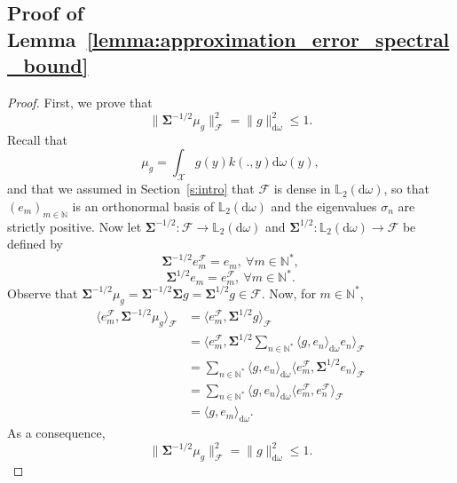 \documentclass[twoside,11pt]{book}
\numberwithin{theorem}{chapter}
\numberwithin{definition}{chapter}
\numberwithin{proposition}{chapter}
\numberwithin{corollary}{chapter}
\numberwithin{example}{chapter}
\numberwithin{lemma}{chapter}
\numberwithin{assumption}{chapter}
\newcommand{\ab}[1]{\textcolor{red}{#1}}
\begin{document}
\subsection{Proof of Lemma~\ref{lemma:approximation_error_spectral_bound}}
\label{s:proofOfSeparationLemma}
\begin{proof}
First, we prove that
\begin{equation}
  \|\bm{\Sigma}^{-1/2}\mu_{g}\|_{\mathcal{F}}^{2} = \|g\|_{\mathrm{d}\omega}^{2} \leq 1.
\end{equation} 
 Recall that
\begin{equation}
\mu_{g} = \int_{\mathcal{X}} g(y)k(.,y) \mathrm{d}\omega(y),
\end{equation}
and that we assumed in Section~\ref{s:intro} that $\mathcal{F}$ is dense in $\mathbb{L}_{2}(\mathrm{d}\omega)$, so that $(e_{m})_{m \in \mathbb{N}}$ is an orthonormal basis of $\mathbb{L}_{2}(\mathrm{d}\omega)$ and the eigenvalues $\sigma_{n}$ are strictly positive. Now let $\bm{\Sigma}^{-1/2} : \mathcal{F} \rightarrow \mathbb{L}_{2}(\mathrm{d}\omega)$ and $\bm{\Sigma}^{1/2} : \mathbb{L}_{2}(\mathrm{d}\omega) \rightarrow \mathcal{F}$ be defined by
\begin{equation}
\bm{\Sigma}^{-1/2} e_{m}^{\mathcal{F}} = e_{m}, \: \forall m\in \mathbb{N}^*,
\end{equation}
\begin{equation}
\bm{\Sigma}^{1/2} e_{m} =  e_{m}^{\mathcal{F}}, \: \forall m\in \mathbb{N}^*.
\end{equation}
Observe that $\bm{\Sigma}^{-1/2} \mu_{g} = \bm{\Sigma}^{-1/2} \bm{\Sigma} g = \bm{\Sigma}^{1/2} g \in \mathcal{F}$. Now, for $m \in \mathbb{N}^{*}$,
\begin{align}
\langle e_{m}^{\mathcal{F}}, \bm{\Sigma}^{-1/2}\mu_{g} \rangle_{\mathcal{F}} & =\langle e_{m}^{\mathcal{F}}, \bm{\Sigma}^{1/2}g \rangle_{\mathcal{F}} \\
& = \langle e_{m}^{\mathcal{F}}, \bm{\Sigma}^{1/2} \sum\limits_{n \in \mathbb{N}^{*}} \langle g, e_{n} \rangle_{\mathrm{d}\omega} e_{n} \rangle_{\mathcal{F}}\\
& = \sum\limits_{n \in \mathbb{N}^{*}} \langle g, e_{n} \rangle_{\mathrm{d}\omega} \langle e_{m}^{\mathcal{F}}, \bm{\Sigma}^{1/2} e_{n} \rangle_{\mathcal{F}} \\
& = \sum\limits_{n \in \mathbb{N}^{*}} \langle g, e_{n} \rangle_{\mathrm{d}\omega} \langle e_{m}^{\mathcal{F}},  e_{n}^{\mathcal{F}} \rangle_{\mathcal{F}} \\
& = \langle g,e_{m} \rangle_{\mathrm{d}\omega} \nonumber.
\end{align}
As a consequence,
\begin{equation}\label{eq:bound_on_norm_mean_element}
  \|\bm{\Sigma}^{-1/2}\mu_{g}\|_{\mathcal{F}}^{2} = \|g\|_{\mathrm{d}\omega}^{2} \leq 1.
\end{equation} 





\end{proof}
\end{document}
